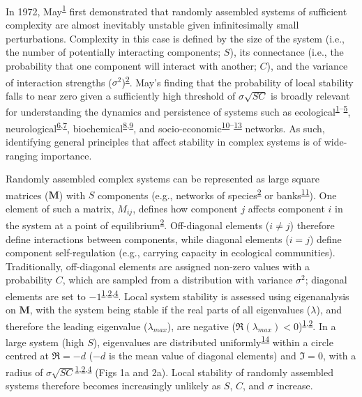 \documentclass[]{article}
\begin{document}
In 1972, May\textsuperscript{\protect\hyperlink{ref-May1972}{1}} first
demonstrated that randomly assembled systems of sufficient complexity
are almost inevitably unstable given infinitesimally small
perturbations. Complexity in this case is defined by the size of the
system (i.e., the number of potentially interacting components; \(S\)),
its connectance (i.e., the probability that one component will interact
with another; \(C\)), and the variance of interaction strengths
(\(\sigma^{2}\))\textsuperscript{\protect\hyperlink{ref-Allesina2012}{2}}.
May's finding that the probability of local stability falls to near zero
given a sufficiently high threshold of \(\sigma\sqrt{SC}\) is broadly
relevant for understanding the dynamics and persistence of systems such
as
ecological\textsuperscript{\protect\hyperlink{ref-May1972}{1}--\protect\hyperlink{ref-Grilli2017}{5}},
neurological\textsuperscript{\protect\hyperlink{ref-Gray2008}{6},\protect\hyperlink{ref-Gray2009}{7}},
biochemical\textsuperscript{\protect\hyperlink{ref-Rosenfeld2009}{8},\protect\hyperlink{ref-MacArthur2010}{9}},
and
socio-economic\textsuperscript{\protect\hyperlink{ref-May2008}{10}--\protect\hyperlink{ref-Bardoscia2017}{13}}
networks. As such, identifying general principles that affect stability
in complex systems is of wide-ranging importance.

Randomly assembled complex systems can be represented as large square
matrices (\(\mathbf{M}\)) with \(S\) components (e.g., networks of
species\textsuperscript{\protect\hyperlink{ref-Allesina2012}{2}} or
banks\textsuperscript{\protect\hyperlink{ref-Haldane2011}{11}}). One
element of such a matrix, \(M_{ij}\), defines how component \(j\)
affects component \(i\) in the system at a point of
equilibrium\textsuperscript{\protect\hyperlink{ref-Allesina2012}{2}}.
Off-diagonal elements (\(i \neq j\)) therefore define interactions
between components, while diagonal elements (\(i = j\)) define component
self-regulation (e.g., carrying capacity in ecological communities).
Traditionally, off-diagonal elements are assigned non-zero values with a
probability \(C\), which are sampled from a distribution with variance
\(\sigma^{2}\); diagonal elements are set to
\(-1\)\textsuperscript{\protect\hyperlink{ref-May1972}{1},\protect\hyperlink{ref-Allesina2012}{2},\protect\hyperlink{ref-Allesina2015}{4}}.
Local system stability is assessed using eigenanalysis on
\(\mathbf{M}\), with the system being stable if the real parts of all
eigenvalues (\(\lambda\)), and therefore the leading eigenvalue
(\(\lambda_{max}\)), are negative
(\(\Re(\lambda_{max}) < 0\))\textsuperscript{\protect\hyperlink{ref-May1972}{1},\protect\hyperlink{ref-Allesina2012}{2}}.
In a large system (high \(S\)), eigenvalues are distributed
uniformly\textsuperscript{\protect\hyperlink{ref-Tao2010}{14}} within a
circle centred at \(\Re = -d\) (\(-d\) is the mean value of diagonal
elements) and \(\Im = 0\), with a radius of
\(\sigma\sqrt{SC}\)\textsuperscript{\protect\hyperlink{ref-May1972}{1},\protect\hyperlink{ref-Allesina2012}{2},\protect\hyperlink{ref-Allesina2015}{4}}
(Figs 1a and 2a). Local stability of randomly assembled systems
therefore becomes increasingly unlikely as \(S\), \(C\), and \(\sigma\)
increase.
\end{document}
